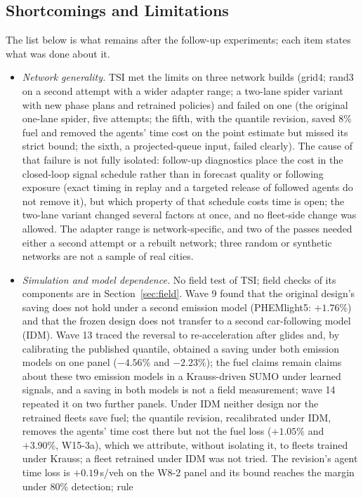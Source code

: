 \subsection{Shortcomings and Limitations}
The list below is what remains after the follow-up experiments; each item states what was done about it.
\begin{itemize}\setlength\itemsep{1pt}
\item \emph{Network generality.} TSI met the limits on three network builds (grid4; rand3 on a second attempt with a wider adapter range;
a two-lane spider variant with new phase plans and retrained policies) and failed on one (the original one-lane spider, five attempts;
the fifth, with the quantile revision, saved $8\%$ fuel and removed the agents' time cost on the point estimate but missed its strict bound;
the sixth, a projected-queue input, failed clearly).
The cause of that failure is not fully isolated: follow-up diagnostics place the cost in the closed-loop signal schedule rather than in
forecast quality or following exposure (exact timing in replay and a targeted release of followed agents do not remove it), but which
property of that schedule costs time is open; the two-lane variant changed several factors at once, and no fleet-side change was allowed. The
adapter range is network-specific, and two of the passes needed either a second attempt or a rebuilt network; three random or synthetic
networks are not a sample of real cities.
\item \emph{Simulation and model dependence.} No field test of TSI; field checks of its components are in Section~\ref{sec:field}. Wave 9 found that the original design's saving does not hold under a second
emission model (PHEMlight5: $+1.76\%$) and that the frozen design does not transfer to a second car-following model (IDM). Wave 13 traced
the reversal to re-acceleration after glides and, by calibrating the published quantile, obtained a saving under both emission models on
one panel ($-4.56\%$ and $-2.23\%$); the fuel claims remain claims about these two emission models in a Krauss-driven SUMO under learned
signals, and a saving in both models is not a field measurement; wave 14 repeated it on two further panels. Under IDM neither design nor
the retrained fleets save fuel; the quantile revision, recalibrated under IDM, removes the agents' time cost there but not the fuel loss
($+1.05\%$ and $+3.90\%$, W15-3a), which we attribute, without isolating it, to fleets trained under Krauss; a fleet retrained under IDM was
not tried. The revision's agent time loss is $+0.19$\,s/veh on the W8-2 panel and its bound reaches the margin under 80\% detection; rule

\end{itemize}
